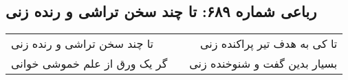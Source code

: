 \begin{center}
\section*{رباعی شماره ۶۸۹: تا چند سخن تراشی و رنده زنی}
\label{sec:sh689}
\begin{longtable}{l p{0.5cm} r}
تا چند سخن تراشی و رنده زنی
&&
تا کی به هدف تیر پراکنده زنی
\\
گر یک ورق از علم خموشی خوانی
&&
بسیار بدین گفت و شنوخنده زنی
\\
\end{longtable}
\end{center}
